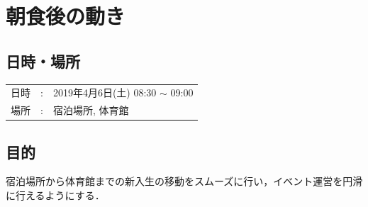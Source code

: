 %

\section{朝食後の動き}


\subsection{日時・場所}
\begin{tabular}{p{}rp{}}
  日時 & : & 2019年4月6日(土) 08:30 $\sim$ 09:00\\
  場所 & : & 宿泊場所, 体育館
\end{tabular}

\subsection{目的}
宿泊場所から体育館までの新入生の移動をスムーズに行い，イベント運営を円滑に行えるようにする．

